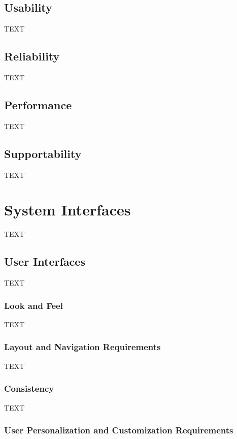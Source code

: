 \subsection{Usability}

TEXT

\subsection{Reliability}

TEXT

\subsection{Performance}

TEXT

\subsection{Supportability}

TEXT

\section{System Interfaces}

TEXT

\subsection{User Interfaces}

TEXT

\subsubsection{Look and Feel}

TEXT

\subsubsection{Layout and Navigation Requirements}

TEXT

\subsubsection{Consistency}

TEXT

\subsubsection{User Personalization and Customization Requirements}

